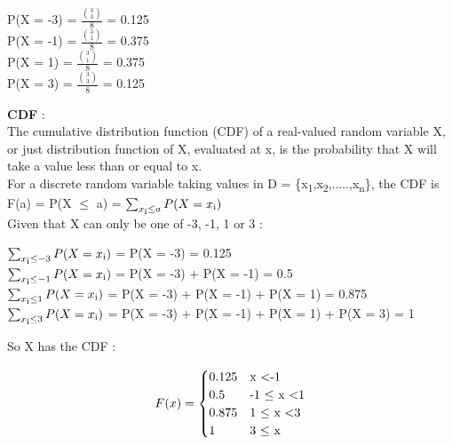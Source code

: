\documentclass{report}
\begin{document}
            \begin{center}
                P(X = -3) = $\frac{{3 \choose 3}}{8}$ = 0.125\\
                P(X = -1) = $\frac{{3 \choose 1}}{8}$ = 0.375\\
                P(X = 1) = $\frac{{3 \choose 1}}{8}$ = 0.375\\
                P(X = 3) = $\frac{{3 \choose 3}}{8}$ = 0.125\\
            \end{center}

            \textbf{CDF} : \\
            The cumulative distribution function (CDF) of a real-valued random variable X, or just distribution function of X, evaluated at x, 
            is the probability that X will take a value less than or equal to x.\\
            For a discrete random variable taking values in D = \{x\textsubscript{1},x\textsubscript{2},.....,x\textsubscript{n}\}, 
            the CDF is F(a) = P(X $\leq$ a) = $\sum_{x\textsubscript{i} \leq a} P(X = x\textsubscript{i})$\\
            Given that X can only be one of -3, -1, 1 or 3 : 
            \begin{center}
                $\sum_{x\textsubscript{i} \leq -3} P(X = x\textsubscript{i})$ = P(X = -3) = 0.125\\
                $\sum_{x\textsubscript{i} \leq -1} P(X = x\textsubscript{i})$ = P(X = -3) + P(X = -1) = 0.5\\
                $\sum_{x\textsubscript{i} \leq 1} P(X = x\textsubscript{i})$ = P(X = -3) + P(X = -1) + P(X = 1) = 0.875\\
                $\sum_{x\textsubscript{i} \leq 3} P(X = x\textsubscript{i})$ = P(X = -3) + P(X = -1) + P(X = 1) + P(X = 3) = 1\\
            \end{center}

            So X has the CDF : 

            \begin{equation}
                F(x) =
                  \begin{cases}
                    0.125 & \text{x \textless -1}\\
                    0.5 & \text{-1 $\leq$ x \textless 1}\\
                    0.875 & \text{1 $\leq$ x \textless 3}\\
                    1 & \text{3 $\leq$ x}
                  \end{cases}       
            \end{equation}
\end{document}
